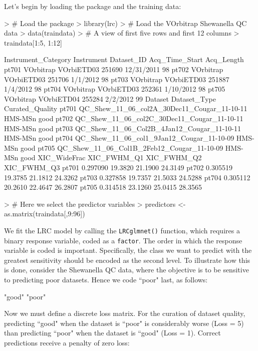 \documentclass{article}
\begin{document}
Let's begin by loading the package and the training data:
\begin{Schunk}
\begin{Sinput}
> # Load the package
> library(lrc)
> # Load the VOrbitrap Shewanella QC data
> data(traindata)
> # A view of first five rows and first 12 columns
> traindata[1:5, 1:12]
\end{Sinput}
\begin{Soutput}
      Instrument_Category Instrument Dataset_ID Acq_Time_Start Acq_Length
pt701           VOrbitrap VOrbiETD03     251690     12/31/2011         98
pt702           VOrbitrap VOrbiETD03     251706       1/1/2012         98
pt703           VOrbitrap VOrbiETD03     251887       1/4/2012         98
pt704           VOrbitrap VOrbiETD03     252361      1/10/2012         98
pt705           VOrbitrap VOrbiETD04     255284       2/2/2012         99
                                          Dataset Dataset_Type Curated_Quality
pt701 QC_Shew_11_06_col2A_30Dec11_Cougar_11-10-11      HMS-MSn            good
pt702 QC_Shew_11_06_col2C_30Dec11_Cougar_11-10-11      HMS-MSn            good
pt703  QC_Shew_11_06_Col2B_4Jan12_Cougar_11-10-11      HMS-MSn            good
pt704   QC_Shew_11_06_col1_9Jan12_Cougar_11-10-09      HMS-MSn            good
pt705  QC_Shew_11_06_Col1B_2Feb12_Cougar_11-10-09      HMS-MSn            good
      XIC_WideFrac XIC_FWHM_Q1 XIC_FWHM_Q2 XIC_FWHM_Q3
pt701     0.297090     19.3820     21.1900     24.3149
pt702     0.305519     19.3785     21.1812     24.3262
pt703     0.327858     19.7357     21.5033     24.5288
pt704     0.305112     20.2610     22.4647     26.2807
pt705     0.314518     23.1260     25.0415     28.3565
\end{Soutput}
\begin{Sinput}
> # Here we select the predictor variables
> predictors <- as.matrix(traindata[,9:96])
\end{Sinput}
\end{Schunk}

\noindent We fit the LRC model by calling the {\tt LRCglmnet()} function, which 
requires a binary response variable, coded
as a {\tt factor}.  The order in which the response variable
is coded is important.  Specifically, the class we want to predict with
the greatest sensitivity should be encoded as the second level. To illustrate how this
is done, consider the Shewanella QC data, where the objective is to be
sensitive to predicting poor datasets.  Hence we code ``poor" last, as follows:
\begin{Schunk}
\begin{Soutput}
[1] "good" "poor"
\end{Soutput}
\end{Schunk}
\noindent Now we must define a discrete loss matrix. For the curation
of dataset quality, predicting ``good" when the dataset is ``poor" is considerably 
worse (Loss = 5) than predicting ``poor" when the dataset
is ``good" (Loss = 1).  Correct predictions receive a penalty of zero loss:
\end{document}
